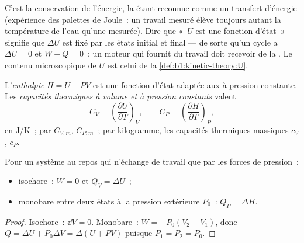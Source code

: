 \begin{remark}[Ce qu'il dit]\label{rem:b1:first-law:meaning}
C'est la conservation de l'énergie, la  étant reconnue comme un
transfert d'énergie (expérience des palettes de Joule~: un travail mesuré
élève toujours autant la température de l'eau qu'une  mesurée). Dire
que «~$U$ est une fonction d'état~» signifie que $\Delta U$ est fixé par les
états initial et final --- de sorte qu'un cycle a $\Delta U = 0$ et
$W + Q = 0$~: un moteur qui fournit du travail doit recevoir de la .
Le contenu microscopique de $U$ est celui de la
\cref{def:b1:kinetic-theory:U}.
\end{remark}

\begin{definition}\label{def:b1:first-law:enthalpy}
L'\emph{enthalpie} $H = U + PV$ est une fonction d'état adaptée aux
 à pression constante. Les \emph{capacités thermiques à
volume et à pression constants} valent
\[
C_V = \left(\frac{\partial U}{\partial T}\right)_V, \qquad
C_P = \left(\frac{\partial H}{\partial T}\right)_P ,
\]
en \unit{J/K}~; par  $C_{V,m}$, $C_{P,m}$~; par kilogramme, les
capacités thermiques massiques $c_V$, $c_P$.
\end{definition}

\begin{proposition}\label{prop:b1:first-law:qvqp}
Pour un système au repos qui n'échange de travail que par les forces de pression~:
\begin{itemize}
  \item {} isochore~: $W = 0$ et $Q_V = \Delta U$~;
  \item {} monobare entre deux états à la pression extérieure
        $P_0$~: $Q_P = \Delta H$.
\end{itemize}
\end{proposition}

\begin{proof}
Isochore~: $\dd V = 0$. Monobare~: $W = -P_0(V_2 - V_1)$, donc $Q = \Delta U +
P_0\Delta V = \Delta(U + PV)$ puisque $P_1 = P_2 = P_0$.
\end{proof}

